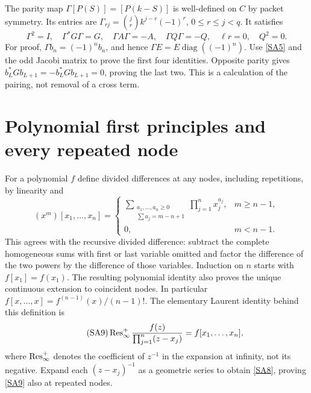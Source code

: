 \documentclass[11pt]{article}
\begin{document}
The parity map $\Gamma[P(S)]=[P(k-S)]$ is well-defined
on $C$ by packet symmetry. Its entries are
$\Gamma_{rj}=\binom jr k^{j-r}(-1)^r$, $0\leq r\leq j<q$.
It satisfies
\begin{equation}\tag{SA7}\label{SA7}
\Gamma^2=I,\quad \Gamma^*G\Gamma=G,\quad
\Gamma A\Gamma=-A,\quad \Gamma Q\Gamma=-Q,\quad
\ell r=0,\quad Q^2=0.
\end{equation}
For proof, $\Gamma b_n=(-1)^nb_n$, and hence
$\Gamma E=E\operatorname{diag}((-1)^n)$.
Use \eqref{SA5} and the odd Jacobi matrix to prove the
first four identities. Opposite parity gives
$b_L^*Gb_{L+1}=-b_L^*Gb_{L+1}=0$, proving the last two.
This is a calculation of the pairing, not removal of a
cross term.

\section{Polynomial first principles and every repeated node}

For a polynomial $f$ define divided differences at any
nodes, including repetitions, by linearity and
\begin{equation}\tag{SA8}\label{SA8}
(x^m)[x_1,\ldots,x_n]=
\begin{cases}
\displaystyle\sum_{\substack{a_1,\ldots,a_n\geq0\\
 \sum a_j=m-n+1}}\prod_{j=1}^n x_j^{a_j},&m\geq n-1,\\
0,&m<n-1.
\end{cases}
\end{equation}
This agrees with the recursive divided difference:
subtract the complete homogeneous sums with first or last
variable omitted and factor the difference of the two
powers by the difference of those variables. Induction
on $n$ starts with $f[x_1]=f(x_1)$.
The resulting polynomial identity also proves the unique
continuous extension to coincident nodes. In particular
$f[x,\ldots,x]=f^{(n-1)}(x)/(n-1)!$.
The elementary Laurent identity behind this definition is
\begin{equation}\tag{SA9}\label{SA9}
\operatorname{Res}_\infty^+\frac{f(z)}
 {\prod_{j=1}^n(z-x_j)}
=f[x_1,\ldots,x_n],
\end{equation}
where $\operatorname{Res}_\infty^+$ denotes the coefficient of $z^{-1}$
in the expansion at infinity, not its negative.
Expand each $(z-x_j)^{-1}$ as a geometric series to obtain
\eqref{SA8}, proving \eqref{SA9} also at repeated nodes.
\end{document}
